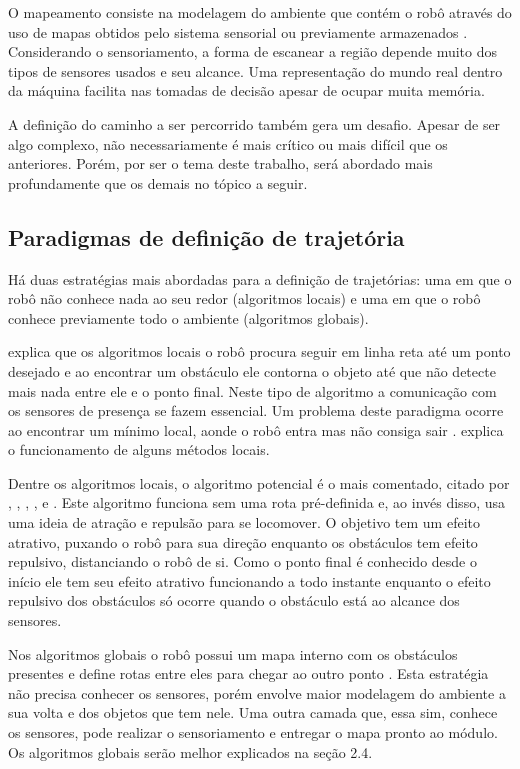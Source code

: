 O mapeamento consiste na modelagem do ambiente que contém o robô através do uso de mapas obtidos pelo sistema sensorial ou previamente armazenados \cite{Souza2008}. Considerando o sensoriamento, a forma de escanear a região depende muito dos tipos de sensores usados e seu alcance. Uma representação do mundo real dentro da máquina facilita nas tomadas de decisão apesar de ocupar muita memória.

A definição do caminho a ser percorrido também gera um desafio. Apesar de ser algo complexo, não necessariamente é mais crítico ou mais difícil que os anteriores. Porém, por ser o tema deste trabalho, será abordado mais profundamente que os demais no tópico a seguir.

\subsection{Paradigmas de definição de trajetória}

Há duas estratégias mais abordadas para a definição de trajetórias: uma em que o robô não conhece nada ao seu redor (algoritmos locais) e uma em que o robô conhece previamente todo o ambiente (algoritmos globais).

\cite{Guzman2008} explica que os algoritmos locais o robô procura seguir em linha reta até um ponto desejado e ao encontrar um obstáculo ele contorna o objeto até que não detecte mais nada entre ele e o ponto final. Neste tipo de algoritmo a comunicação com os sensores de presença se fazem essencial. Um problema deste paradigma ocorre ao encontrar um mínimo local, aonde o robô entra mas não consiga sair \cite{Souza2008}. \cite{Secchi2008} explica o funcionamento de alguns métodos locais. 

Dentre os algoritmos locais, o algoritmo potencial é o mais comentado, citado por \cite{Secchi2008}, \cite{Souza2008}, \cite{Guzman2008}, \cite{Choset2005}, \cite{Siegwart2004} e \cite{Thomsen2010}. Este algoritmo funciona sem uma rota pré-definida e, ao invés disso, usa uma ideia de atração e repulsão para se locomover. O objetivo tem um efeito atrativo, puxando o robô para sua direção enquanto os obstáculos tem efeito repulsivo, distanciando o robô de si. Como o ponto final é conhecido desde o início ele tem seu efeito atrativo funcionando a todo instante enquanto o efeito repulsivo dos obstáculos só ocorre quando o obstáculo está ao alcance dos sensores.

Nos algoritmos globais o robô possui um mapa interno com os obstáculos presentes e define rotas entre eles para chegar ao outro ponto \cite{Guzman2008} \cite{Souza2008}. Esta estratégia não precisa conhecer os sensores, porém envolve maior modelagem do ambiente a sua volta e dos objetos que tem nele. Uma outra camada que, essa sim, conhece os sensores, pode realizar o sensoriamento e entregar o mapa pronto ao módulo. Os algoritmos globais serão melhor explicados na seção 2.4.

